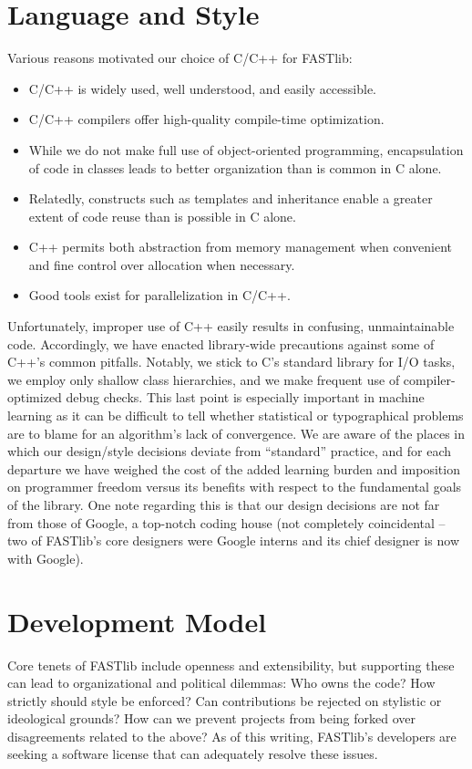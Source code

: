 \documentclass[letter]{report}
\begin{document}
\section {Language and Style}
Various reasons motivated our choice of C/C++ for FASTlib:
\begin{itemize}
\item C/C++ is widely used, well understood, and easily accessible.
\item C/C++ compilers offer high-quality compile-time optimization.
\item While we do not make full use of object-oriented programming,
  encapsulation of code in classes leads to better organization than
  is common in C alone.
\item Relatedly, constructs such as templates and inheritance enable a
  greater extent of code reuse than is possible in C alone.
\item C++ permits both abstraction from memory management when
  convenient and fine control over allocation when necessary.
\item Good tools exist for parallelization in C/C++.
\end{itemize}
Unfortunately, improper use of C++ easily results in confusing,
unmaintainable code.  Accordingly, we have enacted library-wide
precautions against some of C++'s common pitfalls.  Notably, we stick
to C's standard library for I/O tasks, we employ only shallow class
hierarchies, and we make frequent use of compiler-optimized debug
checks.  This last point is especially important in machine learning
as it can be difficult to tell whether statistical or typographical
problems are to blame for an algorithm's lack of convergence.  We are
aware of the places in which our design/style decisions deviate from
``standard'' practice, and for each departure we have weighed the cost of the
added learning burden and imposition on programmer freedom versus its
benefits with respect to the fundamental goals of the library.  One
note regarding this is that our design decisions are not far from
those of Google, a top-notch coding house (not completely coincidental
-- two of FASTlib's core designers were Google interns and its chief
designer is now with Google).

\section{Development Model}
Core tenets of FASTlib include openness and extensibility, but
supporting these can lead to organizational and political dilemmas:
Who owns the code?  How strictly should style be enforced?  Can
contributions be rejected on stylistic or ideological grounds?  How
can we prevent projects from being forked over disagreements related
to the above?  As of this writing, FASTlib's developers are seeking a
software license that can adequately resolve these issues.
\end{document}
